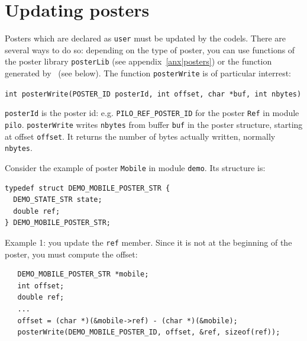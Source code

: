\section{Updating posters}

Posters which are  declared as \texttt{user}  must be updated by the codels.
There are several ways to do so: depending on the type of poster, you can
use  functions of    the      poster  library \texttt{posterLib}      (see
appendix~\ref{anx|posters}) or   the function  generated by \GenoM\  (see
below).  The function \texttt{posterWrite} is of particular interrest:

\bigbreak
\texttt{int posterWrite(POSTER\_ID posterId, int offset, char *buf, int nbytes)}
\bigbreak

\texttt{posterId} is the poster id: e.g. \texttt{PILO\_REF\_POSTER\_ID} for the
poster \texttt{Ref} in  module \texttt{pilo}.   \texttt{posterWrite} writes  
\texttt{nbytes} from buffer \texttt{buf} in the poster structure, starting at offset
\texttt{offset}.  It returns the  number of bytes actually written, normally
\texttt{nbytes}.

\bigbreak

Consider the example  of poster \texttt{Mobile} in module \texttt{demo}. Its
structure is:

\begin{center}\begin{cartouche}\small\begin{verbatim}
typedef struct DEMO_MOBILE_POSTER_STR {
  DEMO_STATE_STR state;
  double ref;
} DEMO_MOBILE_POSTER_STR;
\end{verbatim}\end{cartouche}\end{center}
\label{typedef|demomobile}

Example 1: you update the \texttt{ref} member. Since it is not at the
beginning of the poster, you must compute the offset:

\begin{center}\begin{cartouche}\small\begin{verbatim}
   DEMO_MOBILE_POSTER_STR *mobile;
   int offset;
   double ref;
   ...
   offset = (char *)(&mobile->ref) - (char *)(&mobile);
   posterWrite(DEMO_MOBILE_POSTER_ID, offset, &ref, sizeof(ref));
\end{verbatim}\end{cartouche}\end{center}

